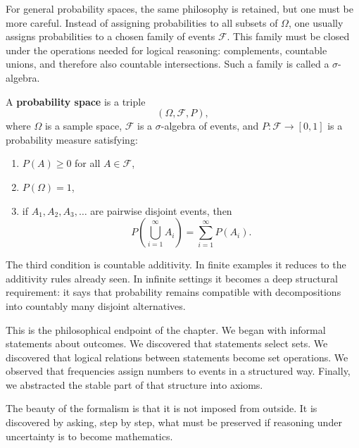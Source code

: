 For general probability spaces, the same philosophy is retained, but one must be more careful. Instead of assigning probabilities to all subsets of \(\Omega\), one usually assigns probabilities to a chosen family of events \(\mathcal{F}\). This family must be closed under the operations needed for logical reasoning: complements, countable unions, and therefore also countable intersections. Such a family is called a \(\sigma\)-algebra.

\begin{definitionbox}
A \textbf{probability space} is a triple
\[
(\Omega,\mathcal{F},P),
\]
where \(\Omega\) is a sample space, \(\mathcal{F}\) is a \(\sigma\)-algebra of events, and \(P:\mathcal{F}\to[0,1]\) is a probability measure satisfying:
\begin{enumerate}
    \item \(P(A)\geq 0\) for all \(A\in\mathcal{F}\),
    \item \(P(\Omega)=1\),
    \item if \(A_1,A_2,A_3,\ldots\) are pairwise disjoint events, then
    \[
    P\left(\bigcup_{i=1}^{\infty}A_i\right)=\sum_{i=1}^{\infty}P(A_i).
    \]
\end{enumerate}
\end{definitionbox}

The third condition is countable additivity. In finite examples it reduces to the additivity rules already seen. In infinite settings it becomes a deep structural requirement: it says that probability remains compatible with decompositions into countably many disjoint alternatives.

This is the philosophical endpoint of the chapter. We began with informal statements about outcomes. We discovered that statements select sets. We discovered that logical relations between statements become set operations. We observed that frequencies assign numbers to events in a structured way. Finally, we abstracted the stable part of that structure into axioms.

The beauty of the formalism is that it is not imposed from outside. It is discovered by asking, step by step, what must be preserved if reasoning under uncertainty is to become mathematics.
